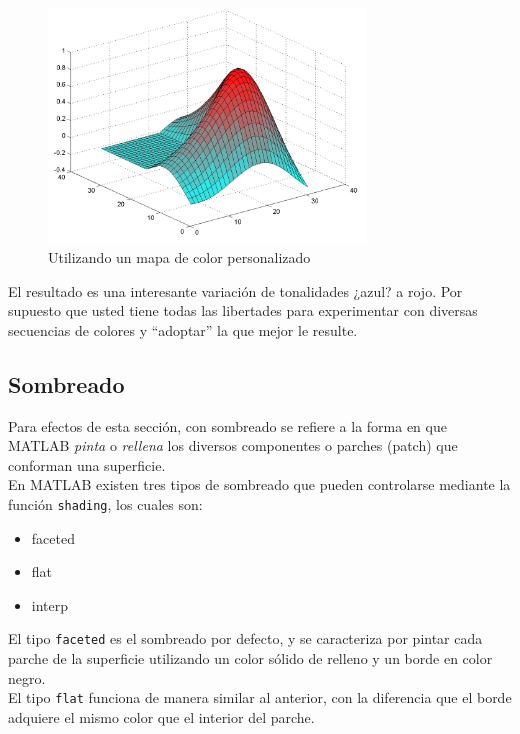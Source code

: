 \begin{figure}[htbp]
    \centering
    \includegraphics[width=0.75\textwidth]{images/ch4/img_4_11.png}
    \caption{Utilizando un mapa de color personalizado}
    \label{fig:img_4_11}
\end{figure}

El resultado es una interesante variación de tonalidades ¿azul? a rojo.
Por supuesto que usted tiene todas las libertades para experimentar con
diversas secuencias de colores y ``adoptar'' la que mejor le resulte.

\subsection{Sombreado}

Para efectos de esta sección, con sombreado se refiere a la forma en que
MATLAB \emph{pinta} o \emph{rellena} los diversos componentes o parches
(patch) que conforman una superficie. \\

En MATLAB existen tres tipos de sombreado que pueden controlarse
mediante la función \texttt{shading}, los cuales son:

\begin{itemize}
\tightlist
\item
  faceted
\item
  flat
\item
  interp
\end{itemize}

El tipo \texttt{faceted} es el sombreado por defecto, y se caracteriza
por pintar cada parche de la superficie utilizando un color sólido de
relleno y un borde en color negro. \\

El tipo \texttt{flat} funciona de manera similar al anterior, con la
diferencia que el borde adquiere el mismo color que el interior del
parche. \\

